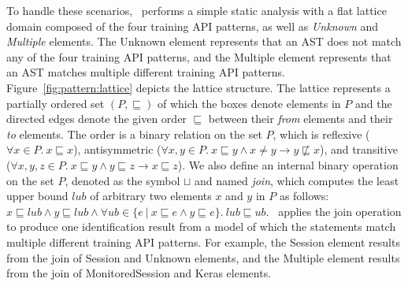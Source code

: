 To handle these scenarios, \tapi~performs a simple static analysis with a flat
lattice domain composed of the four training API patterns, as well as {\it
Unknown} and {\it Multiple} elements. 
The Unknown element represents that an AST does not match any of the four
training API patterns, and the Multiple element represents that an AST matches
multiple different training API patterns.
Figure~\ref{fig:pattern:lattice} depicts the lattice structure.  
The lattice represents a partially ordered set $(P, \sqsubseteq)$ of which the
boxes denote elements in $P$ and the directed edges denote the given order
$\sqsubseteq$ between their {\it from} elements and their {\it to} elements.
The order is a binary relation on the set $P$, which is reflexive ($\forall x
\in P.\ x \sqsubseteq x$), antisymmetric ($\forall x, y \in P.\ x \sqsubseteq y
\wedge x \not= y \to y \not\sqsubseteq x$), and transitive ($\forall x, y, z
\in P.\ x \sqsubseteq y \wedge y \sqsubseteq z \to x \sqsubseteq z$). 
We also define an internal binary operation on the set $P$, denoted as the
symbol $\sqcup$ and named {\it join}, which computes the least upper bound
$lub$ of arbitrary two elements $x$ and $y$ in $P$ as follows: $x \sqsubseteq
lub \wedge y \sqsubseteq lub \wedge \forall ub \in \{e\ |\ x \sqsubseteq e
\wedge y \sqsubseteq e\}.\ lub \sqsubseteq ub$. 
\tapi~applies the join operation to produce one identification result from a
model of which the statements match multiple different training API patterns.
For example, the Session element results from the join of Session and Unknown
elements, and the Multiple element results from the join of MonitoredSession and
Keras elements.

